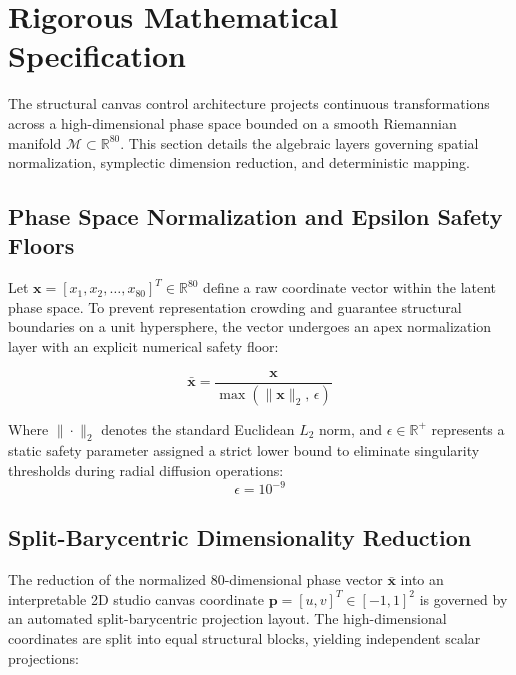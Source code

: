 
\section{Rigorous Mathematical Specification}
\label{sec:core_math}

The structural canvas control architecture projects continuous transformations across a high-dimensional phase space bounded on a smooth Riemannian manifold $\mathcal{M} \subset \mathbb{R}^{80}$. This section details the algebraic layers governing spatial normalization, symplectic dimension reduction, and deterministic mapping.

\subsection{Phase Space Normalization and Epsilon Safety Floors}
Let $\mathbf{x} = [x_1, x_2, \dots, x_{80}]^T \in \mathbb{R}^{80}$ define a raw coordinate vector within the latent phase space. To prevent representation crowding and guarantee structural boundaries on a unit hypersphere, the vector undergoes an apex normalization layer with an explicit numerical safety floor:

\begin{equation}
    \bar{\mathbf{x}} = \frac{\mathbf{x}}{\max\left(\|\mathbf{x}\|_2, \, \epsilon\right)}
\end{equation}

Where $\|\cdot\|_2$ denotes the standard Euclidean $L_2$ norm, and $\epsilon \in \mathbb{R}^+$ represents a static safety parameter assigned a strict lower bound to eliminate singularity thresholds during radial diffusion operations:
\begin{equation}
    \epsilon = 10^{-9}
\end{equation}

\subsection{Split-Barycentric Dimensionality Reduction}
The reduction of the normalized 80-dimensional phase vector $\bar{\mathbf{x}}$ into an interpretable 2D studio canvas coordinate $\mathbf{p} = [u, v]^T \in [-1, 1]^2$ is governed by an automated split-barycentric projection layout. The high-dimensional coordinates are split into equal structural blocks, yielding independent scalar projections:

